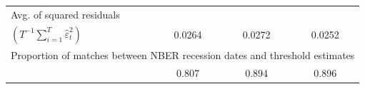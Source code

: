 \documentclass[12pt, reqno]{amsart}
\begin{document}
\begin{table}[htp]
\begin{center}
\begin{tabular}{lrrrrrr}
\hline
\multicolumn{7}{l}{Avg. of squared residuals} \\
$(T^{-1} \sum_{i=1}^T \widehat{\varepsilon}_t^2)$          & \multicolumn{2}{c}{0.0264}  & \multicolumn{2}{c}{0.0272} & \multicolumn{2}{c}{0.0252} \vspace*{1ex} \\
\hline
\multicolumn{7}{l}{Proportion of matches between NBER recession dates and threshold estimates} \\
         & \multicolumn{2}{c}{0.807}  & \multicolumn{2}{c}{0.894} & \multicolumn{2}{c}{0.896} \vspace*{1ex} \\
\hline
\end{tabular}
\end{center}
\label{table-hansen97}
\end{table}
\end{document}
